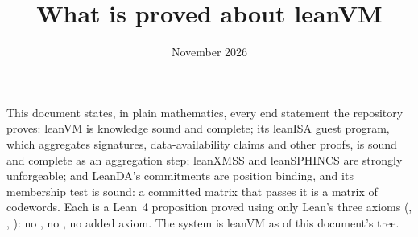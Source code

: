 \documentclass[11pt]{article}
\title{What is proved about leanVM}
\author{}
\date{November 2026}
\begin{document}
\maketitle

\noindent This document states, in plain mathematics, every end statement the repository proves:
leanVM is knowledge sound and complete; its leanISA guest program, which aggregates signatures,
data-availability claims and other proofs, is sound and complete as an aggregation step; leanXMSS
and leanSPHINCS are strongly unforgeable; and LeanDA's commitments are position binding, and its
membership test is sound: a committed matrix that passes it is a matrix of codewords. Each is a Lean~4
proposition proved using only Lean's three axioms (, ,
): no , no , no added axiom. The system is
leanVM as of this document's tree.
\end{document}
